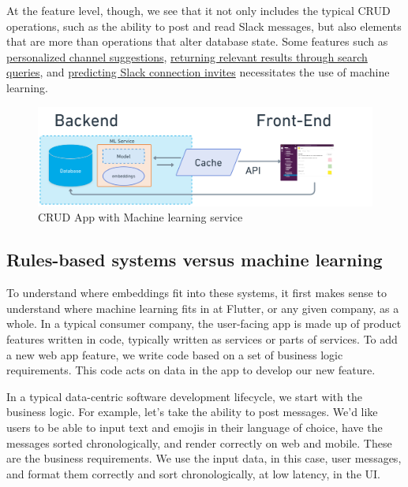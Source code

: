 \documentclass[11pt, table]{diazessay} %
\begin{document}
\begin{sloppypar}
At the feature level, though, we see that it not only includes the typical CRUD operations, such as the ability to post and read Slack messages, but also elements that are more than operations that alter database state. Some features such as \href{https://slack.engineering/personalized-channel-recommendations-in-slack/}{personalized channel suggestions}, \href{https://slack.engineering/search-at-slack/}{returning relevant results through search queries}, and \href{https://slack.engineering/email-classification/}{predicting Slack connection invites} necessitates the use of  machine learning.

\begin{figure}[H]
\centering
\includegraphics[width=\textwidth]{figures/web_service_ml.png}
\caption{CRUD App with Machine learning service}
\end{figure}

\subsection{Rules-based systems versus machine learning}

To understand where embeddings fit into these systems, it first  makes sense to understand where machine learning fits in at Flutter, or any given company, as a whole. In a typical consumer company, the user-facing app is made up of product features written in code, typically written as services or parts of services. To add a new web app feature, we write code based on a set of business logic requirements. This code acts on data in the app to develop our new feature.


In a  typical data-centric software development lifecycle, we start with the business logic. For example, let's take the ability to post messages. We'd like users to be able to input text and emojis in their language of choice, have the messages sorted chronologically, and render correctly on web and mobile. These are the business requirements. We use the input data, in this case, user messages, and format them correctly and sort chronologically, at low latency, in the UI.


\end{sloppypar}
\end{document}
